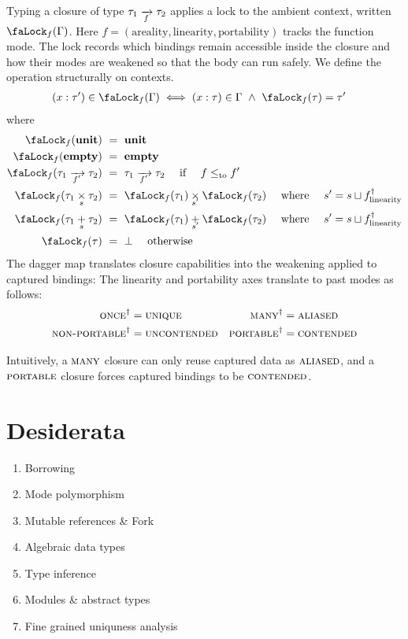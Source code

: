 \documentclass{article}
\newcommand{\kw}[1]{\text{\textbf{#1}}}
\newcommand{\AnnotArrow}[1]{%
  \if\relax\detokenize{#1}\relax
    \to
  \else
    \xrightarrow[\AnnotBelow{#1}]{}
  \fi}
\newcommand{\AnnotBinop}[2]{%
  \if\relax\detokenize{#2}\relax
    #1
  \else
    \underset{\AnnotBelow{#2}}{#1}
  \fi}
\newcommand{\AnnotBelow}[1]{\smash{\raisebox{0.25ex}{$\scriptstyle #1$}}}
\newcommand{\TFun}[3][]{#2 \mathrel{\AnnotArrow{#1}} #3}
\newcommand{\TPair}[3][]{#2 \mathbin{\AnnotBinop{\times}{#1}} #3}
\newcommand{\TSum}[3][]{#2 \mathbin{\AnnotBinop{+}{#1}} #3}
\newcommand{\TUnit}{\kw{unit}}
\newcommand{\TEmpty}{\kw{empty}}
\newcommand{\leqto}{\mathrel{\leq_{\mathrm{to}}}}
\newcommand{\mode}[1]{\textsc{#1}}
\newcommand{\Lock}[2][]{
  \text{\faLock}_{#1}(#2)
}
\begin{document}
Typing a closure of type $\TFun[f]{\tau_1}{\tau_2}$ applies a lock to the ambient context, written $\Lock[f]{\Gamma}$. 
Here $f=(\text{areality}, \text{linearity}, \text{portability})$ tracks the function mode. 
The lock records which bindings remain accessible inside the closure and how their modes are weakened so that the body can run safely.
We define the operation structurally on contexts.
\begin{align*}
(x:\tau') \in \Lock[f]{\Gamma} &\iff (x:\tau) \in \Gamma \ \land\ \Lock[f]{\tau} = \tau'
\end{align*}
where
\begin{align*}
  \Lock[f]{\TUnit} &\ =\  \TUnit\\
  \Lock[f]{\TEmpty} &\ =\ \TEmpty\\
  \Lock[f]{\TFun[f']{\tau_1}{\tau_2}} &\ =\ \TFun[f']{\tau_1}{\tau_2} \quad\text{ if }\quad f \leqto f'\\
  \Lock[f]{\TPair[s]{\tau_1}{\tau_2}} &\ =\ \TPair[s']{\Lock[f]{\tau_1}}{\Lock[f]{\tau_2}} \quad\text{ where }\quad s' = s \sqcup f_{\text{linearity}}^\dagger\\
  \Lock[f]{\TSum[s]{\tau_1}{\tau_2}} &\ =\ \TSum[s']{\Lock[f]{\tau_1}}{\Lock[f]{\tau_2}} \quad\text{ where }\quad s' = s \sqcup f_{\text{linearity}}^\dagger\\
  \Lock[f]{\tau} &\ =\ \bot \quad\text{ otherwise}
\end{align*}
The dagger map translates closure capabilities into the weakening applied to captured bindings:
The linearity and portability axes translate to past modes as follows:
\begin{align*}
\mode{once}^{\dagger} &= \mode{unique} &
\mode{many}^{\dagger} &= \mode{aliased} \\
\mode{non-portable}^{\dagger} &= \mode{uncontended} &
\mode{portable}^{\dagger} &= \mode{contended}
\end{align*}

Intuitively, a $\mode{many}$ closure can only reuse captured data as $\mode{aliased}$, and a $\mode{portable}$ closure forces captured bindings to be $\mode{contended}$.

\section{Desiderata}

\begin{enumerate}
  \item Borrowing
  \item Mode polymorphism
  \item Mutable references \& Fork
  \item Algebraic data types
  \item Type inference
  \item Modules \& abstract types
  \item Fine grained uniquness analysis
\end{enumerate}
\end{document}
